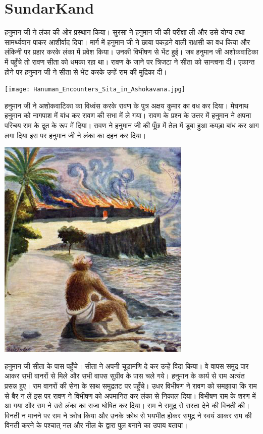\documentclass[makeidx, 10pt, oneside, onecolumn, openright, final, svgnames, dvipsnames, extrafontsizes]{memoir}
\begin{document}
\chapter[सुन्दरकाण्ड]{SundarKand}
\thispagestyle{empty}


\hspace{5mm}हनुमान जी ने लंका की ओर प्रस्थान किया। सुरसा ने हनुमान जी की परीक्षा ली और उसे योग्य तथा सामर्थ्यवान पाकर आशीर्वाद दिया। मार्ग में हनुमान जी ने छाया पकड़ने वाली राक्षसी का वध किया और लंकिनी पर प्रहार करके लंका में प्रवेश किया। उनकी विभीषण से भेंट हुई। जब हनुमान जी अशोकवाटिका में पहुँचे तो रावण सीता को धमका रहा था। रावण के जाने पर त्रिजटा ने सीता को सान्त्वना दी। एकान्त होने पर हनुमान जी ने सीता से भेंट करके उन्हें राम की मुद्रिका दी। 

 \begin{center}
\texttt{[image: Hanuman\_Encounters\_Sita\_in\_Ashokavana.jpg]}
\end{center}

हनुमान जी ने अशोकवाटिका का विध्वंस करके रावण के पुत्र अक्षय कुमार का वध कर दिया। मेघनाथ हनुमान को नागपाश में बांध कर रावण की सभा में ले गया। रावण के प्रश्न के उत्तर में हनुमान ने अपना परिचय राम के दूत के रूप में दिया। रावण ने हनुमान जी की पूँछ में तेल में डूबा हुआ कपड़ा बांध कर आग लगा दिया इस पर हनुमान जी ने लंका का दहन कर दिया।

 \begin{center}
\includegraphics[scale=2]{Hanuman_Watches_Lanka_Burn.jpg}
\end{center}

हनुमान जी सीता के पास पहुँचे। सीता ने अपनी चूड़ामणि दे कर उन्हें विदा किया। वे वापस समुद्र पार आकर सभी वानरों से मिले और सभी वापस सुग्रीव के पास चले गये। हनुमान के कार्य से राम अत्यंत प्रसन्न हुए। राम वानरों की सेना के साथ समुद्रतट पर पहुँचे। उधर विभीषण ने रावण को समझाया कि राम से बैर न लें इस पर रावण ने विभीषण को अपमानित कर लंका से निकाल दिया। विभीषण राम के शरण में आ गया और राम ने उसे लंका का राजा घोषित कर दिया। राम ने समुद्र से रास्ता देने की विनती की। विनती न मानने पर राम ने क्रोध किया और उनके क्रोध से भयभीत होकर समुद्र ने स्वयं आकर राम की विनती करने के पश्चात् नल और नील के द्वारा पुल बनाने का उपाय बताया। 
\end{document}
